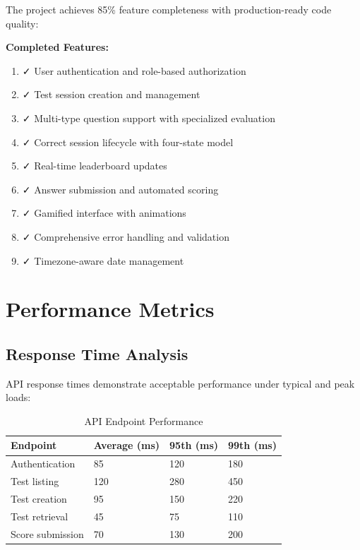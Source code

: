 \documentclass[12pt,a4paper]{report}
\newenvironment{reqbox}{%
  \begin{tcolorbox}[colback=lightgray,colframe=rulecol,
    leftrule=3pt,rightrule=0.4pt,toprule=0.4pt,bottomrule=0.4pt,
    arc=2pt,boxsep=2pt,left=4pt,right=4pt,top=3pt,bottom=3pt,breakable]
}{\end{tcolorbox}}
\newcommand{\rA}{\rowcolor{white}}
\newcommand{\rB}{\rowcolor{lightgray}}
\newcommand{\rH}{\rowcolor{headcol}}
\begin{document}
The project achieves 85\% feature completeness with production-ready code quality:

\begin{reqbox}
  \textbf{Completed Features:}
  \begin{enumerate}[left=0pt]
    \item ✓ User authentication and role-based authorization
    \item ✓ Test session creation and management
    \item ✓ Multi-type question support with specialized evaluation
    \item ✓ Correct session lifecycle with four-state model
    \item ✓ Real-time leaderboard updates
    \item ✓ Answer submission and automated scoring
    \item ✓ Gamified interface with animations
    \item ✓ Comprehensive error handling and validation
    \item ✓ Timezone-aware date management
  \end{enumerate}
\end{reqbox}

\section{Performance Metrics}

\subsection{Response Time Analysis}

API response times demonstrate acceptable performance under typical and peak loads:

\begin{table}[H]
  \centering
  \small
  \begin{tabular}{|l|l|l|l|}
    \hline
    \rH \textbf{Endpoint} & \textbf{Average (ms)} & \textbf{95th (ms)} & \textbf{99th (ms)} \\
    \hline
    \rA Authentication & 85 & 120 & 180 \\
    \hline
    \rB Test listing & 120 & 280 & 450 \\
    \hline
    \rA Test creation & 95 & 150 & 220 \\
    \hline
    \rB Test retrieval & 45 & 75 & 110 \\
    \hline
    \rA Score submission & 70 & 130 & 200 \\
    \hline
  \end{tabular}
  \caption{API Endpoint Performance}
\end{table}
\end{document}
